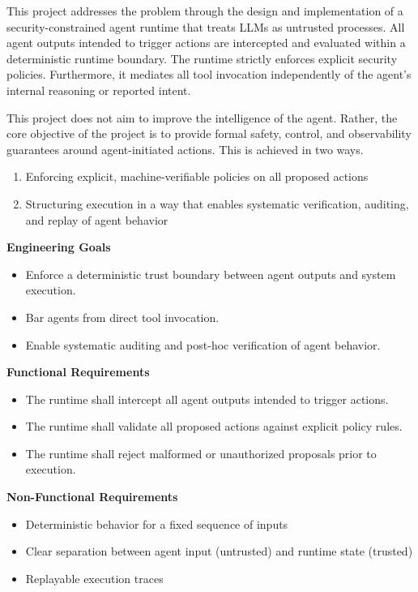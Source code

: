 \documentclass[conference]{IEEEtran}
\begin{document}
This project addresses the problem through the design and implementation of a security-constrained agent runtime that treats LLMs as untrusted processes. All agent outputs intended to trigger actions are intercepted and evaluated within a deterministic runtime boundary. The runtime strictly enforces explicit security policies. Furthermore, it mediates all tool invocation independently of the agent's internal reasoning or reported intent.

This project does not aim to improve the intelligence of the agent. Rather, the core objective of the project is to provide formal safety, control, and observability guarantees around agent-initiated actions. This is achieved in two ways.

\begin{enumerate}[label=(\arabic*)]
    \item Enforcing explicit, machine-verifiable policies on all proposed actions
    \item Structuring execution in a way that enables systematic verification, auditing, and replay of agent behavior
\end{enumerate}

 \textbf{Engineering Goals}
 \begin{itemize}
    \item Enforce a deterministic trust boundary between agent outputs and system execution.
    \item Bar agents from direct tool invocation.
    \item Enable systematic auditing and post-hoc verification of agent behavior.
 \end{itemize}
 
  \textbf{Functional Requirements}
 \begin{itemize}
    \item The runtime shall intercept all agent outputs intended to trigger actions.
    \item The runtime shall validate all proposed actions against explicit policy rules.
    \item The runtime shall reject malformed or unauthorized proposals prior to execution.
 \end{itemize}
 
  \textbf{Non-Functional Requirements}
 \begin{itemize}
    \item Deterministic behavior for a fixed sequence of inputs
    \item Clear separation between agent input (untrusted) and runtime state (trusted)
    \item Replayable execution traces
 \end{itemize}
\end{document}
